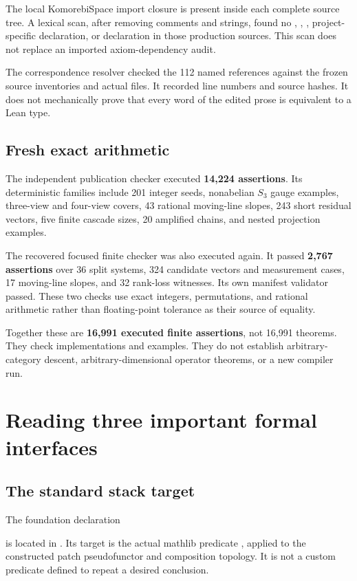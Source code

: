 \documentclass[11pt]{article}
\begin{document}
The local KomorebiSpace import closure is present inside each complete source tree. A lexical scan, after removing comments and strings, found no , , , project-specific  declaration, or  declaration in those production sources. This scan does not replace an imported axiom-dependency audit.

The correspondence resolver checked the 112 named references against the frozen source inventories and actual files. It recorded line numbers and source hashes. It does not mechanically prove that every word of the edited prose is equivalent to a Lean type.

\subsection{Fresh exact arithmetic}
The independent publication checker executed \textbf{14,224 assertions}. Its deterministic families include 201 integer seeds, nonabelian \(S_3\) gauge examples, three-view and four-view covers, 43 rational moving-line slopes, 243 short residual vectors, five finite cascade sizes, 20 amplified chains, and nested projection examples.

The recovered focused finite checker was also executed again. It passed \textbf{2,767 assertions} over 36 split systems, 324 candidate vectors and measurement cases, 17 moving-line slopes, and 32 rank-loss witnesses. Its own manifest validator passed. These two checks use exact integers, permutations, and rational arithmetic rather than floating-point tolerance as their source of equality.

Together these are \textbf{16,991 executed finite assertions}, not 16,991 theorems. They check implementations and examples. They do not establish arbitrary-category descent, arbitrary-dimensional operator theorems, or a new compiler run.

\clearpage\section{Reading three important formal interfaces}
\subsection{The standard stack target}
The foundation declaration
\begin{center}\small{}\end{center}
is located in . Its target is the actual mathlib predicate , applied to the constructed patch pseudofunctor and composition topology. It is not a custom predicate defined to repeat a desired conclusion.
\end{document}
